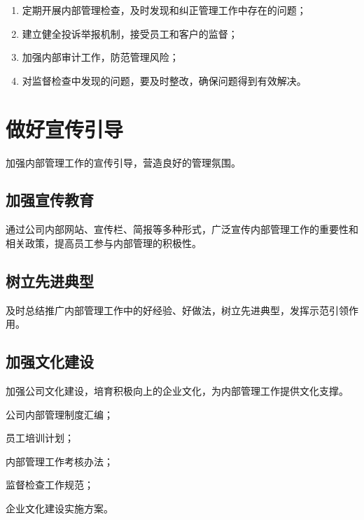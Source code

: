 \documentclass{common-doc}
\begin{document}
\begin{enumerate}
\item 定期开展内部管理检查，及时发现和纠正管理工作中存在的问题；
\item 建立健全投诉举报机制，接受员工和客户的监督；
\item 加强内部审计工作，防范管理风险；
\item 对监督检查中发现的问题，要及时整改，确保问题得到有效解决。
\end{enumerate}

\section{做好宣传引导}
加强内部管理工作的宣传引导，营造良好的管理氛围。

\subsection{加强宣传教育}
通过公司内部网站、宣传栏、简报等多种形式，广泛宣传内部管理工作的重要性和相关政策，提高员工参与内部管理的积极性。

\subsection{树立先进典型}
及时总结推广内部管理工作中的好经验、好做法，树立先进典型，发挥示范引领作用。

\subsection{加强文化建设}
加强公司文化建设，培育积极向上的企业文化，为内部管理工作提供文化支撑。

\begin{附件}
\item 公司内部管理制度汇编；
\item 员工培训计划；
\item 内部管理工作考核办法；
\item 监督检查工作规范；
\item 企业文化建设实施方案。
\end{附件}
\end{document}
